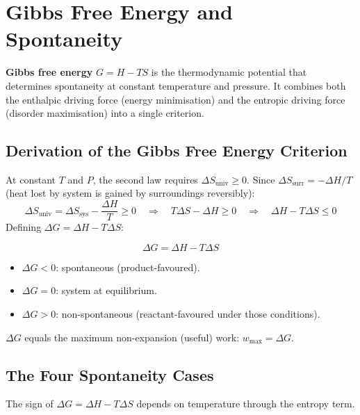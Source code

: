\documentclass[12pt,a4paper]{article}
\begin{document}
\section{Gibbs Free Energy and Spontaneity}

\begin{tcolorbox}[defbox]
\textbf{Gibbs free energy} $G = H - TS$ is the thermodynamic potential that determines spontaneity at constant temperature and pressure. It combines both the enthalpic driving force (energy minimisation) and the entropic driving force (disorder maximisation) into a single criterion.
\end{tcolorbox}

\subsection{Derivation of the Gibbs Free Energy Criterion}
At constant $T$ and $P$, the second law requires $\Delta S_{\mathrm{univ}} \geq 0$. Since $\Delta S_{\mathrm{surr}} = -\Delta H / T$ (heat lost by system is gained by surroundings reversibly):
\[
\Delta S_{\mathrm{univ}} = \Delta S_{\mathrm{sys}} - \frac{\Delta H}{T} \geq 0
\quad\Rightarrow\quad T\Delta S - \Delta H \geq 0
\quad\Rightarrow\quad \Delta H - T\Delta S \leq 0
\]
Defining $\Delta G = \Delta H - T\Delta S$:

\begin{tcolorbox}[formulabox, title={Gibbs Free Energy Criterion}]
\[
\Delta G = \Delta H - T\Delta S
\]
\begin{itemize}[leftmargin=*, itemsep=1pt, topsep=2pt]
  \item $\Delta G < 0$: spontaneous (product-favoured).
  \item $\Delta G = 0$: system at equilibrium.
  \item $\Delta G > 0$: non-spontaneous (reactant-favoured under those conditions).
\end{itemize}
$\Delta G$ equals the maximum non-expansion (useful) work: $w_{\mathrm{max}} = \Delta G$.
\end{tcolorbox}

\subsection{The Four Spontaneity Cases}
The sign of $\Delta G = \Delta H - T\Delta S$ depends on temperature through the entropy term.
\end{document}
